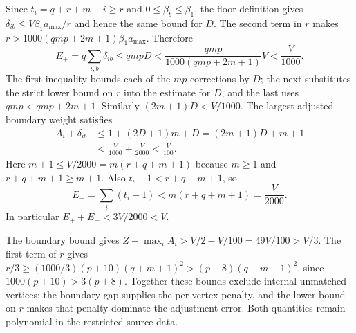 Since $t_i=q+r+m-i\ge r$ and $0\le\beta_b\le\beta_1$,
the floor definition gives
$\delta_{ib}\le V\beta_1a_{\max}/r$ and hence the same bound
for $D$. The second term in $r$ makes
$r>1000(qmp+2m+1)\beta_1a_{\max}$. Therefore
\[
 E_+=q\sum_{i,b}\delta_{ib}
 \le qmpD
 <\frac{qmp}{1000(qmp+2m+1)}V<\frac V{1000}.
\]
The first inequality bounds each of the $mp$ corrections by $D$;
the next substitutes the strict lower bound on $r$ into the estimate
for $D$, and the last uses $qmp<qmp+2m+1$.
Similarly $(2m+1)D<V/1000$. The largest adjusted boundary weight
satisfies
\begin{align*}
 A_i+\delta_{ib}
 &\le1+(2D+1)m+D=(2m+1)D+m+1\\
 &<\frac V{1000}+\frac V{2000}<\frac V{100}.
\end{align*}
Here $m+1\le V/2000=m(r+q+m+1)$ because $m\ge1$ and
$r+q+m+1\ge m+1$. Also $t_i-1<r+q+m+1$, so
\[
 E_-=\sum_i(t_i-1)<m(r+q+m+1)=\frac V{2000}.
\]
In particular $E_++E_-<3V/2000<V$.

The boundary bound gives
$Z-\max_iA_i>V/2-V/100=49V/100>V/3$.
The first term of $r$ gives
$r/3\ge(1000/3)(p+10)(q+m+1)^2>(p+8)(q+m+1)^2$,
since $1000(p+10)>3(p+8)$. Together these bounds exclude internal
unmatched vertices: the boundary gap supplies the per-vertex penalty,
and the lower bound on $r$ makes that penalty dominate the adjustment
error. Both quantities remain polynomial in the restricted source data.
